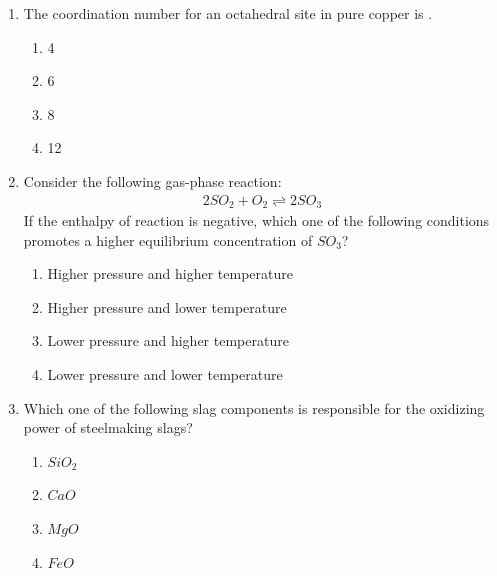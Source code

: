 \documentclass[journal]{IEEEtran}
\theoremstyle{remark}
\begin{document}
\begin{enumerate}[resume]
\item The coordination number for an octahedral site in pure copper is \underline{\hspace{2cm}}. \hfill{}
\begin{multicols}{4}
\begin{enumerate}
\item 4
\item 6
\item 8
\item 12
\end{enumerate}
\end{multicols}

\item Consider the following gas-phase reaction: \hfill{} \\
\begin{align}
 2SO_2 + O_2 \rightleftharpoons 2SO_3 \
\end{align}
If the enthalpy of reaction is negative, which one of the following conditions promotes a higher equilibrium concentration of $SO_3$?
\begin{enumerate}
\item Higher pressure and higher temperature
\item Higher pressure and lower temperature
\item Lower pressure and higher temperature
\item Lower pressure and lower temperature
\end{enumerate}

\item Which one of the following slag components is responsible for the oxidizing power of steelmaking slags? \hfill{}
\begin{multicols}{4}
\begin{enumerate}
\item $SiO_2$
\item $CaO$
\item $MgO$
\item $FeO$
\end{enumerate}
\end{multicols}


\end{enumerate}
\end{document}
